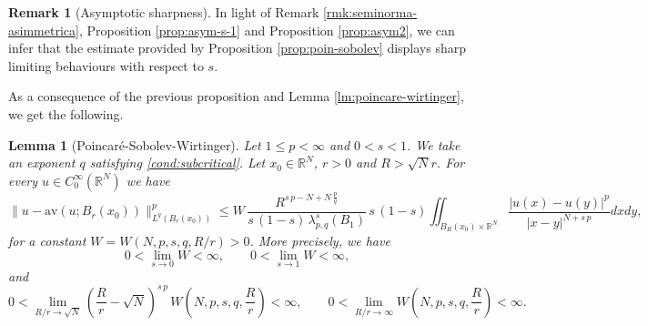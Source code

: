 \documentclass{amsart}
\newtheorem{lemma}[theorem]{Lemma}
\theoremstyle{definition}
\newtheorem{remark}[theorem]{Remark}
\numberwithin{equation}{section}
\begin{document}
\begin{remark}[Asymptotic sharpness] \label{rmk:asym-sharp2}
	In light of Remark \ref{rmk:seminorma-asimmetrica}, Proposition \ref{prop:asym-s-1} and Proposition \ref{prop:asym2}, we can infer that the estimate provided by Proposition \ref{prop:poin-sobolev} displays sharp limiting behaviours with respect to $s$. 
\end{remark}

As a consequence of the previous proposition and Lemma \ref{lm:poincare-wirtinger}, we get the following. 

\begin{lemma}[Poincar\'e-Sobolev-Wirtinger] \label{lm:poin-sob-wirtinger}
	Let $1\le p<\infty$ and $0<s<1$. We take an exponent $q$ satisfying \eqref{cond:subcritical}. 
	Let $x_0 \in \mathbb{R}^N$, $r > 0$ and $R > \sqrt{N}r$. For every $u \in C^\infty_0(\mathbb{R}^N)$ we have 
	\begin{equation*}\label{ineq:poin-wirtinger}
		\|u - \mathrm{av}(u; B_r(x_0))\|^{p}_{L^q(B_r(x_0))} \le W\,\frac{R^{s\,p-N + N\,\frac{p}{q} }}{s\,(1-s)\,\lambda_{p,q}^s(B_1)}\,s\,(1-s)\iint_{B_R(x_0) \times \mathbb{R}^N} \frac{|u(x) - u(y)|^p}{|x-y|^{N+s\,p}}dxdy,
	\end{equation*}
	for a constant $W = W\left(N, p, s, q, R/r\right) > 0$. More precisely, we have 
	\[
	0 < \lim_{s \to 0} W < \infty, \qquad 0< \lim_{s \to 1} W < \infty,
	\]
	and 
	\[
	0 < \lim_{R/r \to \sqrt{N}} \left(\frac{R}{r}-\sqrt{N}\right)^{s\,p}\,W\left(N, p, s, q, \frac{R}{r}\right) < \infty, \qquad	0 < \lim_{R/r \to \infty} W\left(N, p, s, q, \frac{R}{r}\right) < \infty.
	\]
\end{lemma}
\end{document}
